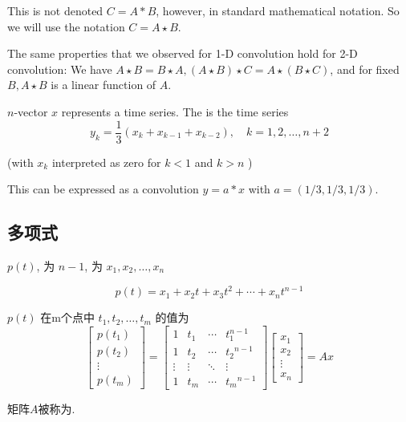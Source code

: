 This is not denoted $ C=A * B $, however, in standard mathematical notation. So we will use the notation $ C=A \star B $.

The same properties that we observed for 1-D convolution hold for 2-D convolution: We have $ A \star B=B \star A,(A \star B) \star C=A \star(B \star C) $, and for fixed $ B, A \star B $ is a linear function of $ A $.

\begin{example}
    $ n $-vector $ x $ represents a time series. The  is the time series
\begin{equation}
y_{k}=\frac{1}{3}\left(x_{k}+x_{k-1}+x_{k-2}\right), \quad k=1,2, \ldots, n+2
\end{equation}

(with $ x_{k} $ interpreted as zero for $ k<1 $ and $ k>n $ )

This can be expressed as a convolution $ y=a * x $ with $ a=(1 / 3,1 / 3,1 / 3) $.
\end{example}

\subsection{多项式}

\begin{definition}[多项式]
     $ p(t) $, 为 $ n-1 $, 为 $ x_{1}, x_{2}, \ldots, x_{n} $

    \begin{equation}
p(t)=x_{1}+x_{2} t+x_{3} t^{2}+\cdots+x_{n} t^{n-1}
\end{equation}
\end{definition}

\begin{definition}
    $ {p}({t}) $ 在m个点中 $ t_{1}, t_{2}, \ldots, t_{m} $ 的值为
    \begin{equation}
    \left[\begin{array}{c}
    p\left(t_{1}\right) \\
    p\left(t_{2}\right) \\
    \vdots \\
    p\left(t_{m}\right)
    \end{array}\right]=\left[\begin{array}{cccc}
    1 & t_{1} & \cdots & t_{1}^{n-1} \\
    1 & t_{2} & \cdots & t_{2}{ }^{n-1} \\
    \vdots & \vdots & \ddots & \vdots \\
    1 & t_{m} & \cdots & t_{m}{ }^{n-1}
    \end{array}\right]\left[\begin{array}{c}
    x_{1} \\
    x_{2} \\
    \vdots \\
    x_{n}
    \end{array}\right]=A x
    \end{equation}

    矩阵$A$被称为.
\end{definition}

